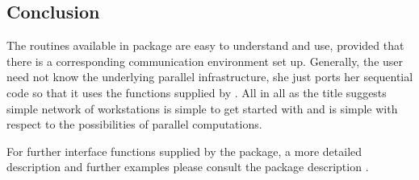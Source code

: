 \subsection{Conclusion}

The routines available in package  are easy to understand
and use, provided that there is a corresponding communication
environment set up. Generally, the user need not know the underlying
parallel infrastructure, she just ports her sequential code so that it
uses the functions supplied by . All in all as the title
suggests simple network of workstations is simple to get started with
and is simple with respect to the possibilities of parallel
computations. 

For further interface functions supplied by the  package, a
more detailed 
description and further examples please consult the package description
\cite{tierney07snow}.
